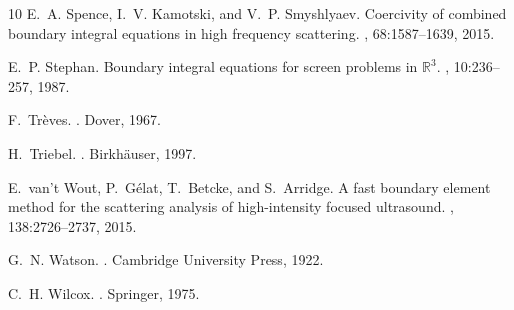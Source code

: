 \documentclass{birkjour}
\theoremstyle{definition}
\theoremstyle{remark}
\numberwithin{equation}{section}
\begin{document}
\begin{thebibliography}{10}
E.~A. Spence, I.~V. Kamotski, and V.~P. Smyshlyaev.
\newblock Coercivity of combined boundary integral equations in high frequency
  scattering.
, 68:1587--1639, 2015.

E.~P. Stephan.
\newblock Boundary integral equations for screen problems in $\mathbb{R}^3$.
, 10:236--257, 1987.

F.~Tr\`eves.
.
\newblock Dover, 1967.

H.~Triebel.
.
\newblock Birkh{\"a}user, 1997.

E.~van't Wout, P.~G\'elat, T.~Betcke, and S.~Arridge.
\newblock A fast boundary element method for the scattering analysis of
  high-intensity focused ultrasound.
, 138:2726--2737, 2015.

G.~N. Watson.
.
\newblock Cambridge University Press, 1922.

C.~H. Wilcox.
.
\newblock Springer, 1975.

\end{thebibliography}
\end{document}
